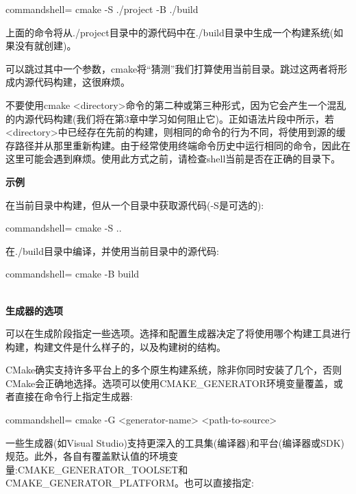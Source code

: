 \begin{tcblisting}{commandshell={}}
cmake -S ./project -B ./build
\end{tcblisting}

上面的命令将从./project目录中的源代码中在./build目录中生成一个构建系统(如果没有就创建)。

可以跳过其中一个参数，cmake将“猜测”我们打算使用当前目录。跳过这两者将形成内源代码构建，这很麻烦。

\begin{tcolorbox}[colback=red!5!white,colframe=red!75!black,title=不推荐]
不要使用cmake <directory>命令的第二种或第三种形式，因为它会产生一个混乱的内源代码构建(我们将在第3章中学习如何阻止它)。正如语法片段中所示，若<directory>中已经存在先前的构建，则相同的命令的行为不同，将使用到源的缓存路径并从那里重新构建。由于经常使用终端命令历史中运行相同的命令，因此在这里可能会遇到麻烦。使用此方式之前，请检查shell当前是否在正确的目录下。
\end{tcolorbox}

\textbf{示例}

在当前目录中构建，但从一个目录中获取源代码(-S是可选的):

\begin{tcblisting}{commandshell={}}
cmake -S ..
\end{tcblisting}

在./build目录中编译，并使用当前目录中的源代码:

\begin{tcblisting}{commandshell={}}
cmake -B build
\end{tcblisting}

\hspace*{\fill} \\ %
\noindent
\textbf{生成器的选项}

可以在生成阶段指定一些选项。选择和配置生成器决定了将使用哪个构建工具进行构建，构建文件是什么样子的，以及构建树的结构。
 
CMake确实支持许多平台上的多个原生构建系统，除非你同时安装了几个，否则CMake会正确地选择。选项可以使用CMAKE\_GENERATOR环境变量覆盖，或者直接在命令行上指定生成器:

\begin{tcblisting}{commandshell={}}
cmake -G <generator-name> <path-to-source>
\end{tcblisting}

一些生成器(如Visual Studio)支持更深入的工具集(编译器)和平台(编译器或SDK)规范。此外，各自有覆盖默认值的环境变量:CMAKE\_GENERATOR\_TOOLSET和CMAKE\_GENERATOR\_PLATFORM。也可以直接指定:

